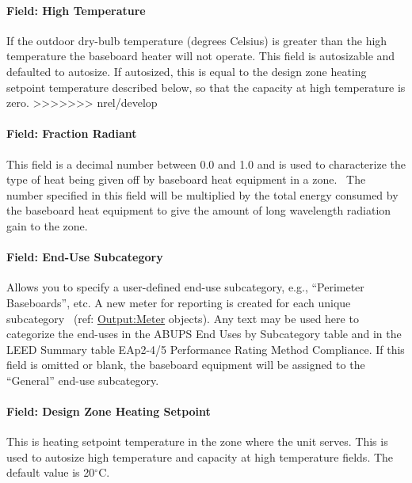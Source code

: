 \paragraph{Field: High Temperature}\label{field-high-temperature}

If the outdoor dry-bulb temperature (degrees Celsius) is greater than the high temperature the baseboard heater will not operate. This field is autosizable and defaulted to autosize. If autosized, this is equal to the design zone heating setpoint temperature described below, so that the capacity at high temperature is zero.
>>>>>>> nrel/develop

\paragraph{Field: Fraction Radiant}\label{field-fraction-radiant-7}

This field is a decimal number between 0.0 and 1.0 and is used to characterize the type of heat being given off by baseboard heat equipment in a zone.~ The number specified in this field will be multiplied by the total energy consumed by the baseboard heat equipment to give the amount of long wavelength radiation gain to the zone.

\paragraph{Field: End-Use Subcategory}\label{field-end-use-subcategory-5}

Allows you to specify a user-defined end-use subcategory, e.g., ``Perimeter Baseboards'', etc. A new meter for reporting is created for each unique subcategory~ (ref: \hyperref[outputmeter-and-outputmetermeterfileonly]{Output:Meter} objects). Any text may be used here to categorize the end-uses in the ABUPS End Uses by Subcategory table and in the LEED Summary table EAp2-4/5 Performance Rating Method Compliance. If this field is omitted or blank, the baseboard equipment will be assigned to the ``General'' end-use subcategory.

\paragraph{Field: Design Zone Heating Setpoint}\label{field-design-zone-heating-setpoint}

This is heating setpoint temperature in the zone where the unit serves. This is used to autosize high temperature and capacity at high temperature fields. The default value is 20$^\circ$C.

